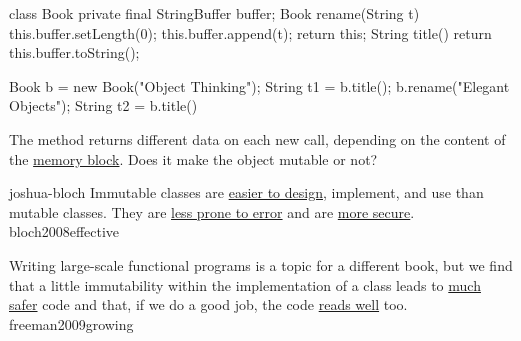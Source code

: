 \documentclass{article}
\begin{document}
\begin{pptWide}{2}
{\small\begin{ffcode}
class Book {
  private final StringBuffer buffer;
  Book rename(String t) {
    this.buffer.setLength(0);
    this.buffer.append(t);
    return this;
  }
  String title() {
    return this.buffer.toString();
  }
}
\end{ffcode}
}
\par\columnbreak\par
{\small\begin{ffcode}
Book b = new Book("Object Thinking");
String t1 = b.title();
b.rename("Elegant Objects");
String t2 = b.title()
\end{ffcode}
}
\par
The  method returns different data on each new call,
depending on the content of the \ul{memory block}.
Does it make the object mutable or not?
\end{pptWide}
\par
\plush{}



\qte
  {joshua-bloch}
  {Immutable classes are \ul{easier to design}, implement, and use than mutable classes. They are \ul{less prone to error} and are \ul{more secure}.}
  {bloch2008effective}

  {Writing large-scale functional programs is a topic for a different book, but we find that a little immutability within the implementation of a class leads to \ul{much safer} code and that, if we do a good job, the code \ul{reads well} too.}
  {freeman2009growing}
\end{document}
